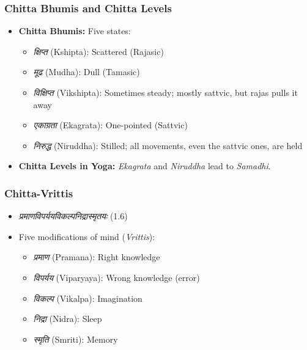 \begin{frame}[fragile]\frametitle{Chitta Bhumis and Chitta Levels}

    \begin{itemize}
        \item \textbf{Chitta Bhumis:} Five states:
        \begin{itemize}
            \item \textit{क्षिप्त} (Kshipta): Scattered (Rajasic)
            \item \textit{मूढ} (Mudha): Dull (Tamasic)
            \item \textit{विक्षिप्त} (Vikshipta): Sometimes steady; mostly sattvic, but rajas pulls it away
            \item \textit{एकाग्रता} (Ekagrata): One-pointed (Sattvic)
            \item \textit{निरुद्ध} (Niruddha): Stilled; all movements, even the sattvic ones, are held
        \end{itemize}
        \item \textbf{Chitta Levels in Yoga:} \textit{Ekagrata} and \textit{Niruddha} lead to \textit{Samadhi}.
    \end{itemize}

\end{frame}


\begin{frame}[fragile]\frametitle{Chitta-Vrittis}
    \begin{itemize}
        \item \textit{प्रमाणविपर्ययविकल्पनिद्रास्मृतयः} (1.6)
        \item Five modifications of mind (\textit{Vrittis}):
        \begin{itemize}
            \item \textit{प्रमाण} (Pramana): Right knowledge
            \item \textit{विपर्यय} (Viparyaya): Wrong knowledge (error)
            \item \textit{विकल्प} (Vikalpa): Imagination
            \item \textit{निद्रा} (Nidra): Sleep
            \item \textit{स्मृति} (Smriti): Memory
        \end{itemize}
    \end{itemize}
\end{frame}

